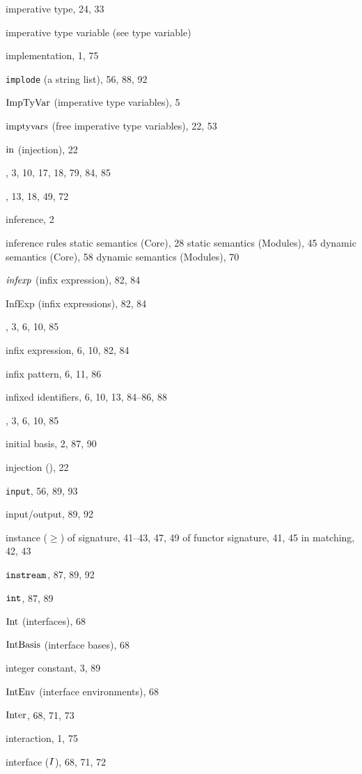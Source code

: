 \begin{theindex}
\item imperative type, 24, 33
\item imperative type variable (see type variable) 
\item implementation, 1, 75
\item {\tt implode} (a string list), 56, 88, 92
\item ${\rm ImpTyVar}$ (imperative type variables), 5
\item $\mathop{\rm imptyvars}\nolimits$ (free imperative type variables), 22, 53
\item $\mbox{\rm in}$ (injection), 22
\item \IN, 3, 10, 17, 18, 79, 84, 85
\item \INCLUDE, 13, 18, 49, 72
\item inference, 2
\item inference rules 
\subitem static semantics (Core), 28
\subitem static semantics (Modules), 45
\subitem dynamic semantics (Core), 58
\subitem dynamic semantics (Modules), 70
\item ${\it infexp}$ (infix expression), 82, 84
\item InfExp (infix expressions), 82, 84
\item \INFIX, 3, 6, 10, 85
\item infix expression, 6, 10, 82, 84
\item infix pattern, 6, 11, 86
\item infixed identifiers, 6, 10, 13, 84--86, 88
\item \INFIXR, 3, 6, 10, 85
\item initial basis, 2, 87, 90
\item injection (\In), 22
\item {\tt input}, 56, 89, 93
\item input/output, 89, 92
\item instance ($\geq$) 
\subitem of signature, 41--43, 47, 49
\subitem of functor signature, 41, 45
\subitem in matching, 42, 43
\item $\mbox{\tt instream}$, 87, 89, 92
\item $\mbox{\tt int}$, 87, 89
\item ${\rm Int}$ (interfaces), 68
\item ${\rm IntBasis}$ (interface bases), 68
\item integer constant, 3, 89
\item ${\rm IntEnv}$ (interface environments), 68
\item $\mathop{\rm Inter}\nolimits$, 68, 71, 73
\item interaction, 1, 75
\item interface ($I$), 68, 71, 72

\end{theindex}
